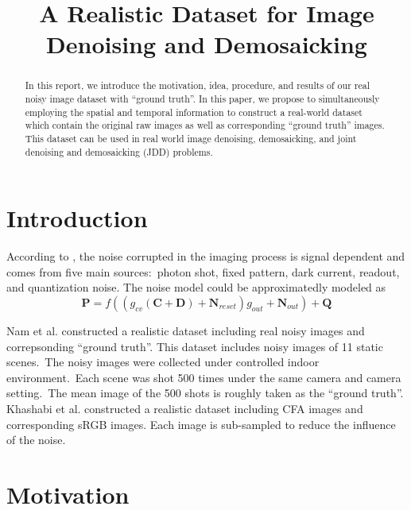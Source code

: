 \documentclass[10pt,twocolumn,letterpaper]{article}
\begin{document}
\title{A Realistic Dataset for Image Denoising and Demosaicking}

\maketitle



\begin{abstract}
In this report, we introduce the motivation, idea, procedure, and results of our real noisy image dataset with ``ground truth''. In this paper, we propose to simultaneously employing the spatial and temporal information to construct a real-world dataset which contain the original raw images as well as corresponding ``ground truth'' images. This dataset can be used in real world image denoising, demosaicking, and joint denoising and demosaicking (JDD) problems.
\end{abstract}

\section{Introduction}

According to \cite{healey1994radiometric}, the noise corrupted in the imaging process is signal dependent and comes from five main sources:\ photon shot, fixed pattern, dark current, readout, and quantization noise. The noise model could be approximatedly modeled as 
\begin{equation}
\bm{P} = f((g_{cv}(\bm{C}+\bm{D})+\bm{N}_{reset})g_{out}+\bm{N}_{out})+\bm{Q}
\end{equation}


Nam et al. \cite{crosschannel2016} constructed a realistic dataset including real noisy images and correpsonding ``ground truth''. This dataset includes noisy images of 11 static scenes.\ The noisy images were collected under controlled indoor environment.\ Each scene was shot 500 times under the same camera and camera setting.\ The mean image of the 500 shots is roughly taken as the ``ground truth''. Khashabi et al. \cite{khashabi2014joint} constructed a realistic dataset including CFA images and corresponding sRGB images. Each image is sub-sampled to reduce the influence of the noise.

\section{Motivation}
\end{document}
